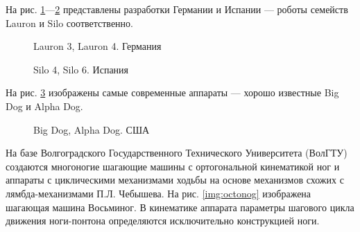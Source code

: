 На рис. \ref{img:lauron}---\ref{img:silo} представлены разработки Германии и Испании --- роботы семейств Lauron и Silo соответственно.

\begin{figure}[ht]
	\begin{minipage}[ht]{0.49\linewidth}
	\end{minipage}
	\hfill
	\begin{minipage}[ht]{0.49\linewidth}
	\end{minipage}
	\caption{Lauron 3, Lauron 4. Германия}
	\label{img:lauron}
\end{figure}

\begin{figure}[ht]
	\begin{minipage}[ht]{0.49\linewidth}
	\end{minipage}
	\hfill
	\begin{minipage}[ht]{0.49\linewidth}
	\end{minipage}
	\caption{Silo 4, Silo 6. Испания}
	\label{img:silo}
\end{figure}


На рис. \ref{img:bigdog} изображены самые современные аппараты --- хорошо известные Big Dog и Alpha Dog.

\begin{figure}[ht]
	\begin{minipage}[ht]{0.49\linewidth}
	\end{minipage}
	\hfill
	\begin{minipage}[ht]{0.49\linewidth}
	\end{minipage}
	\caption{Big Dog, Alpha Dog. США}
	\label{img:bigdog}
\end{figure}

На базе Волгоградского Государственного Технического Университета (ВолГТУ) создаются многоногие шагающие машины с ортогональной кинематикой ног и аппараты с циклическими механизмами ходьбы на основе механизмов схожих с лямбда-механизмами П.Л. Чебышева. На рис. \ref{img:octonog} изображена шагающая машина Восьминог. В кинематике аппарата параметры шагового цикла движения ноги-понтона определяются исключительно конструкцией ноги. 

